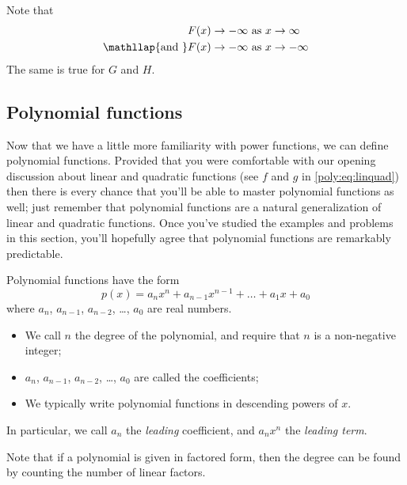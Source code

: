 \begin{doyouunderstand}
\begin{problem}
\begin{subproblem}
\begin{shortsolution}
    Note that
    \begin{align*}
        F(x)\rightarrow-\infty & \text{ as } x\rightarrow\infty\\
        \mathllap{\text{and }}   F(x)\rightarrow-\infty & \text{ as } x\rightarrow-\infty
    \end{align*}
    The same is true for $G$ and $H$.
    \end{shortsolution}
\end{subproblem}
\end{problem}
\end{doyouunderstand}

\subsection*{Polynomial functions}
Now that we have a little more familiarity with power functions, 
we can define polynomial functions. Provided that you were comfortable
with our opening discussion about linear and quadratic functions (see 
$f$ and $g$ in \cref{poly:eq:linquad}) then there is every chance 
that you'll be able to master polynomial functions as well; just remember
that polynomial functions are a natural generalization of linear
and quadratic functions. Once you've studied the examples and problems
in this section, you'll hopefully agree that polynomial functions
are remarkably predictable.

\begin{pccdefinition}
Polynomial functions have the form
\[
    p(x)=a_nx^n+a_{n-1}x^{n-1}+\ldots+a_1x+a_0
\]
where $a_n$, $a_{n-1}$, $a_{n-2}$, \ldots, $a_0$ are real numbers.
\begin{itemize}
    \item We call $n$ the degree of the polynomial, and require that $n$
     is a non-negative integer;
    \item $a_n$, $a_{n-1}$, $a_{n-2}$, \ldots, $a_0$ are called the coefficients;
    \item We typically write polynomial functions in descending powers of $x$.
\end{itemize}
In particular, we call $a_n$ the \emph{leading} coefficient, and $a_nx^n$ the 
\emph{leading term}.

Note that if a polynomial is given in factored form, then the degree can be found 
by counting the number of linear factors.
\end{pccdefinition}

